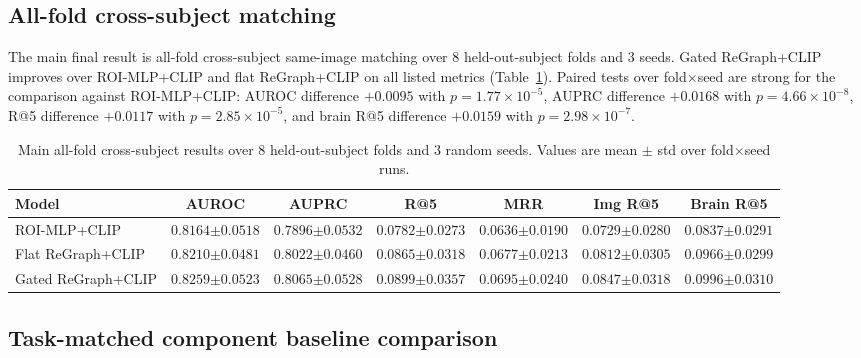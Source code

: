 \documentclass{article}
\begin{document}
\subsection{All-fold cross-subject matching}

The main final result is all-fold cross-subject same-image matching over 8 held-out-subject folds and 3 seeds. Gated ReGraph+CLIP improves over ROI-MLP+CLIP and flat ReGraph+CLIP on all listed metrics (Table~\ref{tab:cross_subject_main}). Paired tests over fold$\times$seed are strong for the comparison against ROI-MLP+CLIP: AUROC difference $+0.0095$ with $p=1.77\times10^{-5}$, AUPRC difference $+0.0168$ with $p=4.66\times10^{-8}$, R@5 difference $+0.0117$ with $p=2.85\times10^{-5}$, and brain R@5 difference $+0.0159$ with $p=2.98\times10^{-7}$.

\begin{table}[!htbp]
  \centering
  \caption{Main all-fold cross-subject results over 8 held-out-subject folds and 3 random seeds. Values are mean $\pm$ std over fold$\times$seed runs.}
  \label{tab:cross_subject_main}
  \scriptsize
  \setlength{\tabcolsep}{3.5pt}
  \renewcommand{\arraystretch}{1.15}
  \begin{tabular}{lcccccc}
    \toprule
    Model & AUROC & AUPRC & R@5 & MRR & Img R@5 & Brain R@5 \\
    \midrule
    ROI-MLP+CLIP
    & $0.8164{\scriptstyle\pm0.0518}$
    & $0.7896{\scriptstyle\pm0.0532}$
    & $0.0782{\scriptstyle\pm0.0273}$
    & $0.0636{\scriptstyle\pm0.0190}$
    & $0.0729{\scriptstyle\pm0.0280}$
    & $0.0837{\scriptstyle\pm0.0291}$ \\
    Flat ReGraph+CLIP
    & $0.8210{\scriptstyle\pm0.0481}$
    & $0.8022{\scriptstyle\pm0.0460}$
    & $0.0865{\scriptstyle\pm0.0318}$
    & $0.0677{\scriptstyle\pm0.0213}$
    & $0.0812{\scriptstyle\pm0.0305}$
    & $0.0966{\scriptstyle\pm0.0299}$ \\
    Gated ReGraph+CLIP
    & $\mathbf{0.8259}{\scriptstyle\pm0.0523}$
    & $\mathbf{0.8065}{\scriptstyle\pm0.0528}$
    & $\mathbf{0.0899}{\scriptstyle\pm0.0357}$
    & $\mathbf{0.0695}{\scriptstyle\pm0.0240}$
    & $\mathbf{0.0847}{\scriptstyle\pm0.0318}$
    & $\mathbf{0.0996}{\scriptstyle\pm0.0310}$ \\
    \bottomrule
  \end{tabular}
\end{table}

\subsection{Task-matched component baseline comparison}
\end{document}
